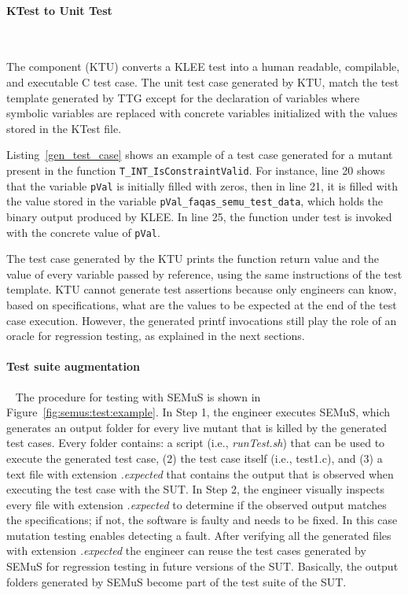 

\paragraph{KTest to Unit Test}\





The component  (KTU) converts a KLEE test into a human readable, compilable, and executable C test case. The unit test case generated by KTU, match the test template generated by TTG except for the declaration of variables where symbolic variables are replaced with concrete variables initialized with the values stored in the KTest file.

Listing~\ref{gen_test_case} shows an example of a test case generated for a mutant present in the function \texttt{T\_INT\_Is\-ConstraintValid}. For instance, line 20 shows that the variable \texttt{pVal} is initially filled with zeros, then in line 21, it is filled with the value stored in the variable \texttt{pVal\_faqas\_semu\_test\_data}, which holds the binary output produced by KLEE. In line 25, the function under test is invoked with the concrete value of \texttt{pVal}.

The test case generated by the KTU prints the function return value and the value of every variable passed by reference, using the same instructions of the test template.
KTU cannot generate test assertions because only engineers can know, based on specifications, what are the values to be expected at the end of the test case execution.
However, the generated printf invocations still play the role of an oracle for regression testing, as explained in the next sections.

\paragraph{Test suite augmentation} \
\label{sec:Semus:augment}
The procedure for testing with SEMuS is shown in Figure~\ref{fig:semus:test:example}.
In Step 1, the engineer executes SEMuS, which generates an output folder for every live mutant that is killed by the generated test cases.
Every folder contains: a script (i.e., \emph{runTest.sh}) that can be used to execute the generated test case, (2) the test case itself (i.e., test1.c), and (3) a text file with extension \emph{.expected} that contains the output that is observed when executing the test case with the SUT.
In Step 2, the engineer visually inspects every file with extension \emph{.expected} to determine if the observed output matches the specifications; if not, the software is faulty and needs to be fixed. In this case mutation testing enables detecting a fault.
After verifying all the generated files with extension \emph{.expected} the engineer can reuse the test cases generated by SEMuS for regression testing in future versions of the SUT. Basically, the output folders generated by SEMuS become part of the test suite of the SUT.

